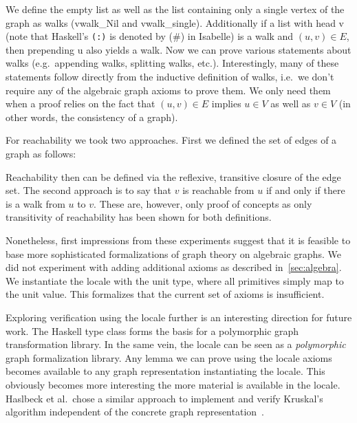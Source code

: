 \documentclass{article}
\newcommand{\hs}{\texttt}
\newcommand*{\term}[1]{{\isaspacing\isastyle }}
\newcommand*{\Term}[1]{{\isaspacing\isastyle #1}}
\begin{document}
\vspace{3mm}
\term{terms/vwalk_def}
\vspace{3mm}\newline
We define the empty list as well as the list containing only a single vertex of
the graph as walks (\Term{vwalk\_Nil} and \Term{vwalk\_single}). Additionally if
a list with head \Term{v} (note that Haskell's \hs{(:)} is denoted by \Term{(\#)} in
Isabelle) is a walk and $(u,v) \in E$, then prepending \Term{u} also yields a
walk. Now we can prove various statements about walks (e.g.\ appending walks,
splitting walks, etc.). Interestingly, many of these statements follow directly
from the inductive definition of walks, i.e.\ we don't require any of the
algebraic graph axioms to prove them. We only need them when a proof relies on
the fact that $(u,v) \in E$ implies $u \in V$ as well as $v \in V$ (in other
words, the consistency of a graph).

For reachability we took two approaches. First we defined the set of edges of a
graph as follows:

\vspace{3mm}
\term{terms/edge_set_def}
\vspace{3mm}\newline
Reachability then can be defined via the reflexive, transitive closure of the
edge set. The second approach is to say that $v$ is reachable from $u$ if and
only if there is a walk from $u$ to $v$. These are, however, only proof of
concepts as only transitivity of reachability has been shown for both definitions.

Nonetheless, first impressions from these experiments suggest that it is
feasible to base more sophisticated formalizations of graph theory on algebraic
graphs. We did not experiment with adding additional axioms as described
in~\autoref{sec:algebra}. We instantiate the locale with the unit type, where
all primitives simply map to the unit value. This formalizes that the current
set of axioms is insufficient.

Exploring verification using the locale further is an interesting direction for
future work. The Haskell type class forms the basis for a polymorphic graph
transformation library. In the same vein, the locale can be seen as a
\textit{polymorphic} graph formalization
library. Any lemma we can prove using the locale axioms becomes available to any
graph representation instantiating the locale. This obviously becomes more
interesting the more material is available in the locale. Haslbeck et al.\ chose
a similar approach to implement and verify Kruskal's algorithm independent of
the concrete graph representation~\cite{Kruskal-AFP}.
\end{document}
